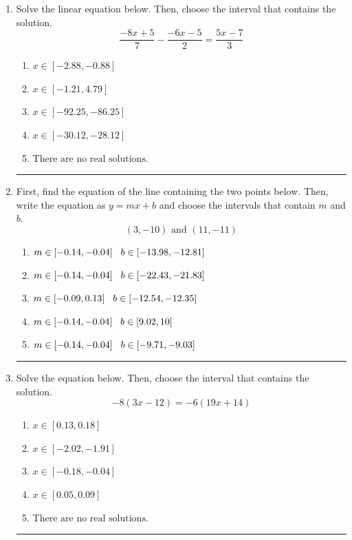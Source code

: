 \documentclass[14pt]{extbook}
\newcommand{\litem}[1]{\item#1\hspace*{-1cm}\rule{\textwidth}{0.4pt}}
\begin{document}
\begin{enumerate}
{\begin{enumerate}[label=\Alph*.]
\end{enumerate} }
\litem{
Solve the linear equation below. Then, choose the interval that contains the solution.\[ \frac{-8x + 5}{7} - \frac{-6x -5}{2} = \frac{5x -7}{3} \]\begin{enumerate}[label=\Alph*.]
\item \( x \in [-2.88, -0.88] \)
\item \( x \in [-1.21, 4.79] \)
\item \( x \in [-92.25, -86.25] \)
\item \( x \in [-30.12, -28.12] \)
\item \( \text{There are no real solutions.} \)

\end{enumerate} }
\litem{
First, find the equation of the line containing the two points below. Then, write the equation as $ y=mx+b $ and choose the intervals that contain $m$ and $b$.\[ (3, -10) \text{ and } (11, -11) \]\begin{enumerate}[label=\Alph*.]
\item \( m \in [-0.14, -0.04] \hspace*{3mm} b \in [-13.98, -12.81] \)
\item \( m \in [-0.14, -0.04] \hspace*{3mm} b \in [-22.43, -21.83] \)
\item \( m \in [-0.09, 0.13] \hspace*{3mm} b \in [-12.54, -12.35] \)
\item \( m \in [-0.14, -0.04] \hspace*{3mm} b \in [9.02, 10] \)
\item \( m \in [-0.14, -0.04] \hspace*{3mm} b \in [-9.71, -9.03] \)

\end{enumerate} }
\litem{
Solve the equation below. Then, choose the interval that contains the solution.\[ -8(3x -12) = -6(19x + 14) \]\begin{enumerate}[label=\Alph*.]
\item \( x \in [0.13, 0.18] \)
\item \( x \in [-2.02, -1.91] \)
\item \( x \in [-0.18, -0.04] \)
\item \( x \in [0.05, 0.09] \)
\item \( \text{There are no real solutions.} \)


\end{enumerate}}
\end{enumerate}
\end{document}
